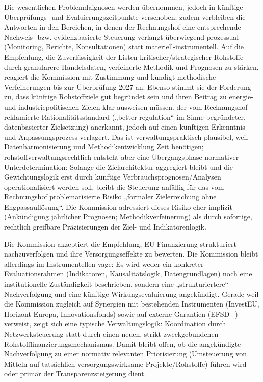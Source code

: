 \documentclass[12pt,a4paper,oneside]{book} %
\begin{document}
Die wesentlichen Problemdaignosen werden übernommen, jedoch in künftige Überprüfungs- und Evaluierungszeitpunkte verschoben; zudem verbleiben die Antworten in den Bereichen, in denen der Rechnungshof eine entsprechende Nachweis- bzw. evidenzbasierte Steuerung verlangt überwiegend prozessual (Monitoring, Berichte, Konsultationen) statt materiell-instrumentell. Auf die Empfehlung, die Zuverlässigkeit der Listen kritischer/strategischer Rohstoffe durch granularere Handelsdaten, verfeinerte Methodik und Prognosen zu stärken, reagiert die Kommission mit Zustimmung und kündigt methodische Verfeinerungen bis zur Überprüfung 2027 an.  Ebenso stimmt sie der Forderung zu, dass künftige Rohstoffziele gut begründet sein und ihren Beitrag zu energie- und industriepolitischen Zielen klar ausweisen müssen. der vom Rechnungshof reklamierte Rationalitätsstandard („better regulation“ im Sinne begründeter, datenbasierter Zielsetzung) anerkannt, jedoch auf einen künftigen Erkenntnis- und Anpassungsprozess verlagert.  Das ist verwaltungspraktisch plausibel, weil Datenharmonisierung und Methodikentwicklung Zeit benötigen; rohstoffverwaltungsrechtlich entsteht aber eine Übergangsphase normativer Unterdetermination: Solange die Zielarchitektur aggregiert bleibt und die Gewichtungslogik erst durch künftige Verbrauchsprognosen/Analysen operationalisiert werden soll, bleibt die Steuerung anfällig für das vom Rechnungshof problematisierte Risiko „formaler Zielerreichung ohne Engpassauflösung“.  Die Kommission adressiert dieses Risiko eher implizit (Ankündigung jährlicher Prognosen; Methodikverfeinerung) als durch sofortige, rechtlich greifbare Präzisierungen der Ziel- und Indikatorenlogik.

Die Kommission akzeptiert die Empfehlung, EU‑Finanzierung strukturiert nachzuverfolgen und ihre Versorgungseffekte zu bewerten. Die Kommission bleibt allerdings im Instrumentellen vage: Es wird weder ein konkreter Evaluationsrahmen (Indikatoren, Kausalitätslogik, Datengrundlagen) noch eine institutionelle Zuständigkeit beschrieben, sondern eine „strukturiertere“ Nachverfolgung und eine künftige Wirkungsevaluierung angekündigt. Gerade weil die Kommission zugleich auf Synergien mit bestehenden Instrumenten (InvestEU, Horizont Europa, Innovationsfonds) sowie auf externe Garantien (EFSD+) verweist, zeigt sich eine typische Verwaltungslogik: Koordination durch Netzwerksteuerung statt durch einen neuen, strikt zweckgebundenen Rohstofffinanzierungsmechanismus.  Damit bleibt offen, ob die angekündigte Nachverfolgung zu einer normativ relevanten Priorisierung (Umsteuerung von Mitteln auf tatsächlich versorgungswirksame Projekte/Rohstoffe) führen wird oder primär der Transparenzsteigerung dient.
\end{document}
